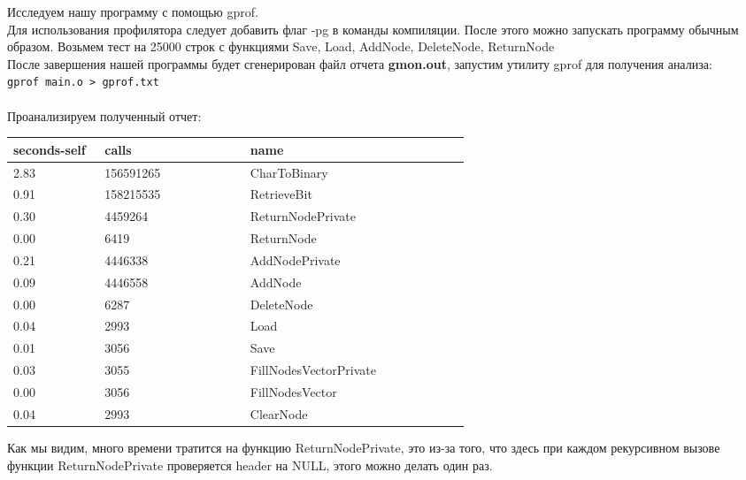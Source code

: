 \documentclass[12pt]{article}
\begin{document}
Исследуем нашу программу с помощью gprof. \\
Для использования профилятора следует добавить флаг -pg в команды компиляции. После этого можно запускать программу обычным образом.
Возьмем тест на 25000 строк с функциями Save, Load, AddNode, DeleteNode, ReturnNode\\
После завершения нашей программы будет сгенерирован файл отчета \textbf{gmon.out}, запустим утилиту gprof для получения анализа: \\
\texttt{gprof main.o > gprof.txt} \\\\
Проанализируем полученный отчет: \\
\begin{table}[ht]
\centering
\begin{tabular}{p{0.1\linewidth} | p{0.2\linewidth} | p{0.3\linewidth}}
\hline
seconds-self & calls & name  \\ \hline
   2.83    &   156591265 &   CharToBinary                     \\ \hline
   0.91    &   158215535 &   RetrieveBit                      \\ \hline
   0.30    &     4459264 &   ReturnNodePrivate       \\ \hline
   0.00    &        6419 &   ReturnNode              \\ \hline
   0.21    &     4446338  &  AddNodePrivate          \\ \hline 
   0.09    &     4446558  &  AddNode                 \\ \hline
   0.00    &       6287   &  DeleteNode              \\ \hline 
   0.04    &       2993   &  Load                    \\ \hline     
   0.01    &       3056   &  Save                    \\ \hline 
   0.03    &       3055   &  FillNodesVectorPrivate  \\ \hline
   0.00    &       3056   &  FillNodesVector         \\ \hline     
   0.04    &       2993   &  ClearNode               \\ \hline     
\end{tabular}
\end{table}

Как мы видим, много времени тратится на функцию ReturnNodePrivate, это из-за того, что здесь при каждом рекурсивном вызове функции ReturnNodePrivate проверяется header на NULL, этого можно делать один раз.
\end{document}
